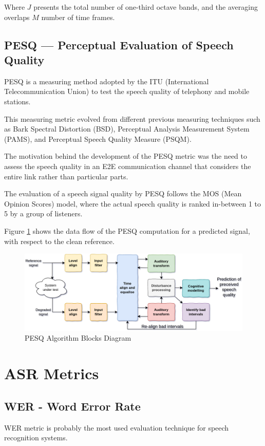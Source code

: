 Where \(J\) presents the total number of one-third octave bands,
and the averaging overlaps \(M\) number of time frames.

\subsection{PESQ --- Perceptual Evaluation of Speech Quality}
PESQ\cite{941023} is a measuring method adopted by 
the ITU (International Telecommunication Union) to
test the speech quality of telephony and mobile stations.

This measuring metric evolved from different previous 
measuring techniques such as Bark Spectral Distortion (BSD),
Perceptual Analysis Measurement System (PAMS),
and Perceptual Speech Quality Measure (PSQM).

The motivation behind the development of the PESQ metric
was the need to assess the speech quality in an E2E
communication channel that considers 
the entire link rather than particular parts.

The evaluation of a speech signal quality by PESQ
follows the MOS (Mean Opinion Scores) model, where
the actual speech quality is ranked in-between 1 to 5 
by a group of listeners.

Figure \ref{fig:pesq_blocks_diagram} shows the data flow
of the PESQ computation for a predicted signal, with respect to the
clean reference.

\begin{figure}[H]
    \centering
    \includegraphics[width=0.85\linewidth]{Features/images/pesq_blocks_diagram_new}
    \caption{PESQ Algorithm Blocks Diagram}\label{fig:pesq_blocks_diagram}
\end{figure}

\section{ASR Metrics}
\subsection{WER - Word Error Rate}
WER\cite{KLAKOW200219} metric is probably the most used evaluation
technique for speech recognition systems.

